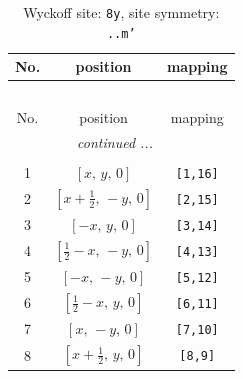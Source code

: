\documentclass[fleqn,8pt]{jsarticle}
\begin{document}
\begin{longtable}{ccc}
\caption{Wyckoff site: {\tt 8y}, site symmetry: {\tt ..m'}}
 \\
 \hline \hline
No. & position & mapping \\ \hline \endfirsthead

\multicolumn{2}{l}{\tablename\ \thetable{}} \\
 \hline \hline
No. & position & mapping \\ \hline \endhead

 \hline \hline
\multicolumn{2}{r}{\footnotesize\it continued ...} \\ \endfoot

 \hline \hline
\multicolumn{2}{r}{} \\ \endlastfoot

1 & $\left[ x,\, y,\, 0 \right]$ & {\tt [1,16]} \\ \hline
2 & $\left[ x + \frac{1}{2},\, - y,\, 0 \right]$ & {\tt [2,15]} \\ \hline
3 & $\left[ - x,\, y,\, 0 \right]$ & {\tt [3,14]} \\ \hline
4 & $\left[ \frac{1}{2} - x,\, - y,\, 0 \right]$ & {\tt [4,13]} \\ \hline
5 & $\left[ - x,\, - y,\, 0 \right]$ & {\tt [5,12]} \\ \hline
6 & $\left[ \frac{1}{2} - x,\, y,\, 0 \right]$ & {\tt [6,11]} \\ \hline
7 & $\left[ x,\, - y,\, 0 \right]$ & {\tt [7,10]} \\ \hline
8 & $\left[ x + \frac{1}{2},\, y,\, 0 \right]$ & {\tt [8,9]} \\
\end{longtable}
\renewcommand{\arraystretch}{1.2}
\end{document}
